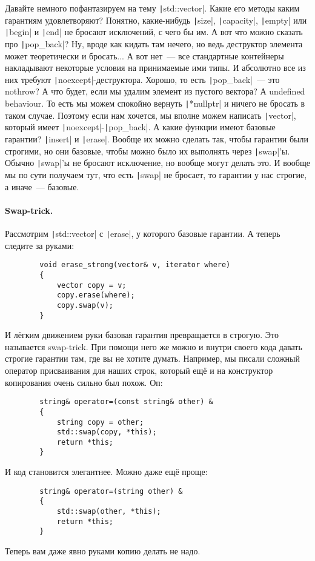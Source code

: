 \documentclass{article}
\begin{document}
    Давайте немного пофантазируем на тему \texttt|std::vector|. Какие его методы каким гарантиям удовлетворяют? Понятно, какие-нибудь \texttt|size|, \texttt|capacity|, \texttt|empty| или \texttt|begin| и \texttt|end| не бросают исключений, с чего бы им. А вот что можно сказать про \texttt|pop_back|? Ну, вроде как кидать там нечего, но ведь деструктор элемента может теоретически и бросать... А вот нет~--- все стандартные контейнеры накладывают некоторые условия на принимаемые ими типы. И абсолютно все из них требуют \texttt|noexcept|-деструктора. Хорошо, то есть \texttt|pop_back|~--- это nothrow? А что будет, если мы удалим элемент из пустого вектора? А undefined behaviour. То есть мы можем спокойно вернуть \texttt|*nullptr| и ничего не бросать в таком случае. Поэтому если нам хочется, мы вполне можем написать \texttt|vector|, который имеет \texttt|noexcept|-\texttt|pop_back|. А какие функции имеют базовые гарантии? \texttt|insert| и \texttt|erase|. Вообще их можно сделать так, чтобы гарантии были строгими, но они базовые, чтобы можно было их выполнять через \texttt|swap|'ы. Обычно \texttt|swap|'ы не бросают исключение, но вообще могут делать это. И вообще мы по сути получаем тут, что есть \texttt|swap| не бросает, то гарантии у нас строгие, а иначе~--- базовые.
    \paragraph{Swap-trick.}
    Рассмотрим \texttt|std::vector| с \texttt|erase|, у которого базовые гарантии. А теперь следите за руками:
    \begin{verbatim}
        void erase_strong(vector& v, iterator where)
        {
            vector copy = v;
            copy.erase(where);
            copy.swap(v);
        }
    \end{verbatim}
    И лёгким движением руки базовая гарантия превращается в строгую. Это называется swap-trick. При помощи него же можно и внутри своего кода давать строгие гарантии там, где вы не хотите думать. Например, мы писали сложный оператор присваивания для наших строк, который ещё и на конструктор копирования очень сильно был похож. Оп:
    \begin{verbatim}
        string& operator=(const string& other) &
        {
            string copy = other;
            std::swap(copy, *this);
            return *this;
        }
    \end{verbatim}
    И код становится элегантнее. Можно даже ещё проще:
    \begin{verbatim}
        string& operator=(string other) &
        {
            std::swap(other, *this);
            return *this;
        }
    \end{verbatim}
    Теперь вам даже явно руками копию делать не надо.
\end{document}
